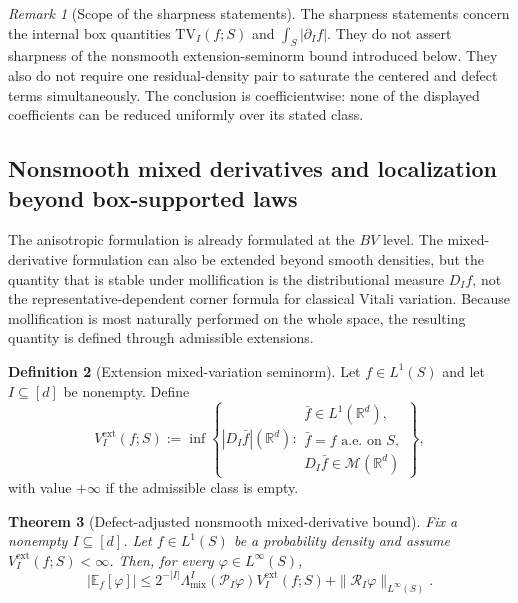 \documentclass[11pt,letterpaper]{article}
\newtheorem{theorem}{Theorem}[section]
\theoremstyle{definition}
\newtheorem{definition}[theorem]{Definition}
\theoremstyle{remark}
\newtheorem{remark}[theorem]{Remark}
\newcommand{\TV}{\mathrm{TV}}
\begin{document}
\begin{remark}[Scope of the sharpness statements]
\label{rem:main_scope_sharpness}
The sharpness statements concern the internal box quantities
$\TV_I(f;S)$ and $\int_S|\partial_If|$. They do not assert sharpness of the
nonsmooth extension-seminorm bound introduced below. They also do not require
one residual-density pair to saturate the centered and defect terms
simultaneously. The conclusion is coefficientwise: none of the displayed
coefficients can be reduced uniformly over its stated class.
\end{remark}

  
\subsection{Nonsmooth mixed derivatives and localization beyond box-supported laws}
\label{subsec:main_nonsmooth_extension}
  

The anisotropic formulation is already formulated at the $BV$ level. The
mixed-derivative formulation can also be extended beyond smooth densities, but the
quantity that is stable under mollification is the distributional measure
$D_I f$, not the representative-dependent corner formula for classical Vitali
variation. Because mollification is most naturally performed on the whole
space, the resulting quantity is defined through admissible extensions.

\begin{definition}[Extension mixed-variation seminorm]
\label{def:main_extension_mixed_variation}
Let $f\in L^1(S)$ and let $I\subseteq[d]$ be nonempty. Define
\begin{equation}
\label{eq:main_extension_mixed_variation}
V_I^{\mathrm{ext}}(f;S)
:=
\inf
\left\{
|D_I\bar f|(\mathbb R^d):
\begin{array}{l}
\bar f\in L^1(\mathbb R^d),\\
\bar f=f\text{ a.e. on }S,\\
D_I\bar f\in\mathcal M(\mathbb R^d)
\end{array}
\right\},
\end{equation}
with value $+\infty$ if the admissible class is empty.
\end{definition}

\begin{theorem}[Defect-adjusted nonsmooth mixed-derivative bound]
\label{thm:main_defect_adjusted_nonsmooth_mixed}
Fix a nonempty $I\subseteq[d]$. Let $f\in L^1(S)$ be a probability density and assume
$V_I^{\mathrm{ext}}(f;S)<\infty$. Then, for every
$\varphi\in L^\infty(S)$,
\begin{equation}
\label{eq:main_defect_adjusted_nonsmooth_mixed}
|\mathbb E_f[\varphi]|
\le
2^{-|I|}
\Lambda_{\mathrm{mix}}^I(\mathcal P_I\varphi)
V_I^{\mathrm{ext}}(f;S)
+
\|\mathcal R_I\varphi\|_{L^\infty(S)}.
\end{equation}
\end{theorem}
\end{document}
